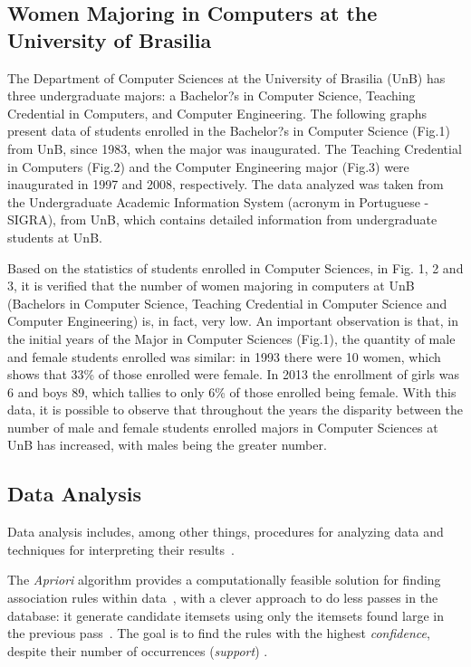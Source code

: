 \subsection{Women Majoring in Computers at the University of Brasilia}

The Department of Computer Sciences at the University of Brasilia (UnB) has three undergraduate majors: a Bachelor?s in Computer Science, Teaching Credential in Computers, and Computer Engineering. 
	The following graphs present data of students enrolled in the Bachelor?s in Computer Science (Fig.1) from UnB, since 1983, when the major was inaugurated. The Teaching Credential in Computers (Fig.2) and the Computer Engineering major (Fig.3) were inaugurated in 1997 and 2008, respectively. The data analyzed was taken from the Undergraduate Academic Information System (acronym in Portuguese - SIGRA), from UnB, which contains detailed information from undergraduate students at UnB.

Based on the statistics of students enrolled in Computer Sciences, in Fig. 1, 2 and 3, it is verified that the number of women majoring in computers at UnB (Bachelors in Computer Science, Teaching Credential in Computer Science and Computer Engineering) is, in fact, very low. An important observation  is that, in the initial years of the Major in Computer Sciences (Fig.1), the quantity of male and female students enrolled was similar: in 1993 there were 10 women, which shows that 33\% of those enrolled were female. In 2013 the enrollment of girls was 6 and boys 89, which tallies to only 6\% of those enrolled being female. With this data, it is possible to observe that throughout the years the disparity between the number of male and female students enrolled majors in Computer Sciences at UnB has increased, with males being the greater number.

\subsection{Data Analysis}\label{subsec:background:data}%

Data analysis includes, among other things, procedures for analyzing data and techniques for interpreting their results~\cite{Tukey1962}.

The \emph{Apriori} algorithm provides a computationally feasible solution for finding association rules within data~\cite{Hastie2009}, with a clever approach to do less passes in the database: it generate candidate itemsets using only the itemsets found large in the previous pass~\cite{Agrawal1994}. The goal is to find the rules with the highest \emph{confidence}, despite their number of occurrences (\emph{support}) \cite{taniar_exception_2008}. 

